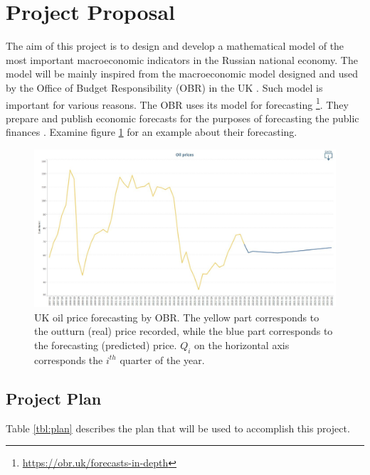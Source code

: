 

\section{Project Proposal}
The aim of this project is to design and develop a mathematical model of the most important macroeconomic indicators in the Russian national economy.
The model will be mainly inspired from the macroeconomic model designed and used by the Office of Budget Responsibility (OBR) in the UK \parencite{obr}.
Such model is important for various reasons.
The OBR uses its model for forecasting%
\footnote{\url{https://obr.uk/forecasts-in-depth}}.
They prepare and publish economic forecasts for the purposes of forecasting the public finances \parencite{obr2}.
Examine figure \ref{img:oil-prices} for an example about their forecasting.

\begin{figure}[!htb]
\centering
\includegraphics[width=1\textwidth]{images/oil-prices.jpg}
\caption{%
UK oil price forecasting by OBR\protect\footnotemark.
The yellow part corresponds to the outturn (real) price recorded,
while the blue part corresponds to the forecasting (predicted) price.
$Q_i$ on the horizontal axis corresponds the $i^{th}$ quarter of the year.
}
\label{img:oil-prices}
\end{figure}





\subsection{Project Plan}
Table \ref{tbl:plan} describes the plan that will be used to accomplish this project.


